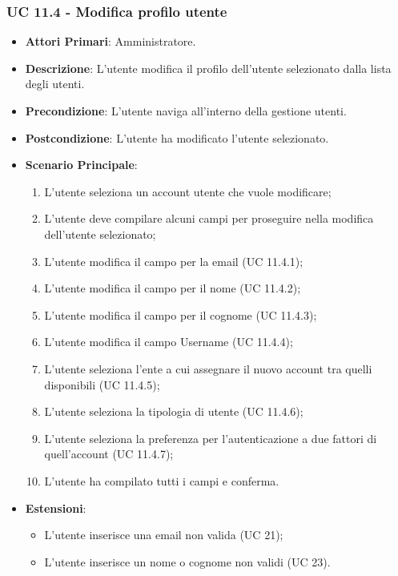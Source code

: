 			\subsubsection{UC 11.4 - Modifica profilo utente}
			\begin{itemize}
				\item \textbf{Attori Primari}: Amministratore.
				\item \textbf{Descrizione}: L'utente modifica il profilo dell'utente selezionato dalla lista degli utenti.
				\item \textbf{Precondizione}: L'utente naviga all'interno della gestione utenti.
				\item \textbf{Postcondizione}: L'utente ha modificato l'utente selezionato.
				\item \textbf{Scenario Principale}:
				\begin{enumerate}
					\item L'utente seleziona un account utente che vuole modificare;
					\item L'utente deve compilare alcuni campi per proseguire nella modifica dell'utente selezionato;
					\item{L'utente modifica il campo per la email (UC 11.4.1);}
					\item{L'utente modifica il campo per il nome (UC 11.4.2);}
					\item{L'utente modifica il campo per il cognome (UC 11.4.3);}
					\item{L'utente modifica il campo Username  (UC 11.4.4);}
					\item{L'utente seleziona l'ente a cui assegnare il nuovo account tra quelli disponibili (UC 11.4.5);}
					\item{L'utente seleziona la tipologia di utente (UC 11.4.6);}
					\item{L'utente seleziona la preferenza per l'autenticazione a due fattori di quell'account (UC 11.4.7);}
					\item{L'utente ha compilato tutti i campi e conferma.}
				\end{enumerate}	
				\item \textbf{Estensioni}:
				\begin{itemize}
					\item L'utente inserisce una email non valida (UC 21);
					\item L'utente inserisce un nome o cognome non validi (UC 23).
				\end{itemize}
			\end{itemize}
			
